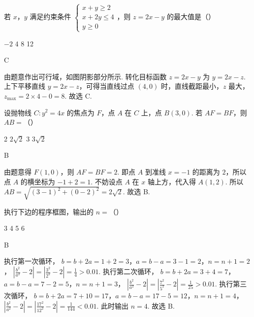 \begin{problem}
若 \(x\)，\(y\) 满足约束条件 \(\begin{cases}
x+y\ge2\\
x+2y\le4\\
y\ge0
\end{cases}\)，则 \(z=2x-y\) 的最大值是（\quad）

\choices
    {\(-2\)}
    {4}
    {8}
    {12}
\end{problem}

\begin{answer}
C
\end{answer}

\begin{solution}
由题意作出可行域，如图阴影部分所示.
转化目标函数 \(z=2x-y\) 为
\(y=2x-z\).
上下平移直线 \(y=2x-z\)，可得当直线过点 \((4,0)\) 时，直线截距最小，\(z\) 最大，
\(z_{\max}=2\times4-0=8\).
故选 C.
\end{solution}

\begin{problem}
设抛物线 \(C:y^2=4x\) 的焦点为 \(F\)，点 \(A\) 在 \(C\) 上，点 \(B(3,0)\). 若 \(AF=BF\)，则 \(AB=\)（\quad）

\choices
    {2}
    {\(2\sqrt2\)}
    {3}
    {\(3\sqrt2\)}
\end{problem}

\begin{answer}
B
\end{answer}

\begin{solution}
由题意得 \(F(1,0)\)，则
\(AF=BF=2\).
即点 \(A\) 到准线 \(x=-1\) 的距离为 \(2\)，所以点 \(A\) 的横坐标为
\(-1+2=1\).
不妨设点 \(A\) 在 \(x\) 轴上方，代入得
\(A(1,2)\).
所以
\(AB=\sqrt{(3-1)^2+(0-2)^2}=2\sqrt2\).
故选 B.
\end{solution}

\begin{problem}
执行下边的程序框图，输出的 \(n=\)（\quad）


\choices
    {3}
    {4}
    {5}
    {6}
\end{problem}

\begin{answer}
B
\end{answer}

\begin{solution}
执行第一次循环，
\(b=b+2a=1+2=3\)，\(a=b-a=3-1=2\)，\(n=n+1=2\)，
\(\left|\frac{b^2}{a^2}-2\right|=\left|\frac{3^2}{2^2}-2\right|=\frac14>0.01\).
执行第二次循环，
\(b=b+2a=3+4=7\)，\(a=b-a=7-2=5\)，\(n=n+1=3\)，
\(\left|\frac{b^2}{a^2}-2\right|=\left|\frac{7^2}{5^2}-2\right|=\frac1{25}>0.01\).
执行第三次循环，
\(b=b+2a=7+10=17\)，\(a=b-a=17-5=12\)，\(n=n+1=4\)，
\(\left|\frac{b^2}{a^2}-2\right|=\left|\frac{17^2}{12^2}-2\right|=\frac1{144}<0.01\).
此时输出 \(n=4\).
故选 B.
\end{solution}

